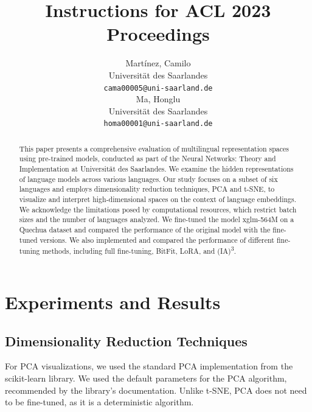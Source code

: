 \documentclass[11pt]{article}
\title{Instructions for ACL 2023 Proceedings}
\author{Martínez, Camilo \\
  Universität des Saarlandes \\
  \texttt{cama00005@uni-saarland.de} \\\And
  Ma, Honglu \\
  Universität des Saarlandes \\
  \texttt{homa00001@uni-saarland.de} \\}
\begin{document}
\maketitle
\begin{abstract}
    This paper presents a comprehensive evaluation of multilingual representation spaces using pre-trained models, conducted as part of the Neural Networks: Theory and Implementation at Universität des Saarlandes. We examine the hidden representations of language models across various languages. Our study focuses on a subset of six languages and employs dimensionality reduction techniques, PCA and t-SNE, to visualize and interpret high-dimensional spaces on the context of language embeddings. We acknowledge the limitations posed by computational resources, which restrict batch sizes and the number of languages analyzed. We fine-tuned the model xglm-564M on a Quechua dataset and compared the performance of the original model with the fine-tuned versions. We also implemented and compared the performance of different fine-tuning methods, including full fine-tuning, BitFit, LoRA, and (IA)\textsuperscript{3}.
\end{abstract}





\section{Experiments and Results}

\subsection{Dimensionality Reduction Techniques}

For PCA visualizations, we used the standard PCA implementation from the scikit-learn library. We used the default parameters for the PCA algorithm, recommended by the library's documentation. Unlike t-SNE, PCA does not need to be fine-tuned, as it is a deterministic algorithm.
\end{document}
